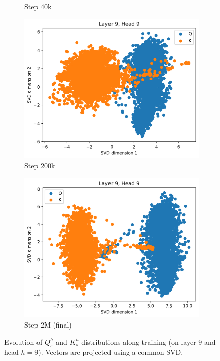 \begin{figure}[ht]
\begin{subfigure}[b]{0.48\linewidth}
         \caption{Step 40k}
         \label{fig:dist_qk_s40}
    \end{subfigure}
    \begin{subfigure}[b]{0.48\linewidth}
         \includegraphics[width=\linewidth]{sources/part_1/anisotropy/imgs/dist_l9h9_s200.png}
         \caption{Step 200k}
         \label{fig:dist_qk_s200}
    \end{subfigure}
    \begin{subfigure}[b]{0.48\linewidth}
         \includegraphics[width=\linewidth]{sources/part_1/anisotropy/imgs/dist_l9h9_s2000.png}
         \caption{Step 2M (final)}
         \label{fig:dist_qk_s2M}
    \end{subfigure}
    \caption{Evolution of $Q^h_s$ and $K^h_s$ distributions along training (on layer $9$ and head $h=9$). Vectors are projected using a common SVD.}
    \label{fig:proj_qk_heads}
\end{figure}

